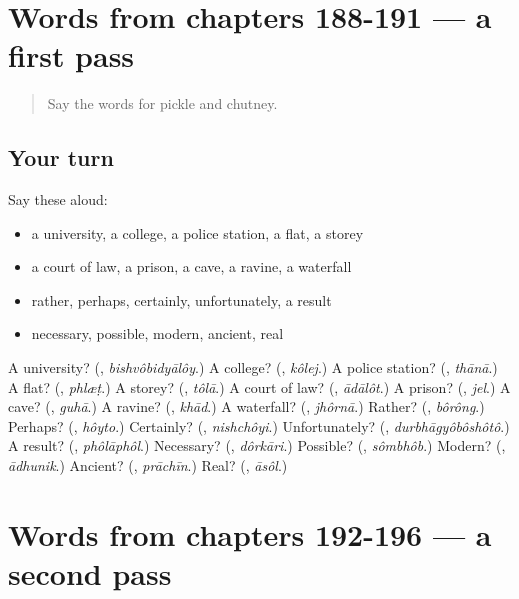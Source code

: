 \section[(dialogue)]{Words from chapters 188-191 — a first pass}

\label{lesson:BN-R196-first-pass-words-from-chapters-188-191}



\begin{quote}
Say the words for pickle and chutney.
\end{quote}

\subsection*{Your turn}
Say these aloud:

\begin{itemize}
\raggedright
  \item a university, a college, a police station, a flat, a storey
  \item a court of law, a prison, a cave, a ravine, a waterfall
  \item rather, perhaps, certainly, unfortunately, a result
  \item necessary, possible, modern, ancient, real
\end{itemize}

\begin{tcolorbox}[breakable,colback=teal!4,colframe=teal!35!black,title={Before you move on}]
A university? (\textbf{}, \emph{bishvôbidyālôy}.) A college? (\textbf{}, \emph{kôlej}.) A police station? (\textbf{}, \emph{thānā}.) A flat? (\textbf{}, \emph{phlæṭ}.) A storey? (\textbf{}, \emph{tôlā}.) A court of law? (\textbf{}, \emph{ādālôt}.) A prison? (\textbf{}, \emph{jel}.) A cave? (\textbf{}, \emph{guhā}.) A ravine? (\textbf{}, \emph{khād}.) A waterfall? (\textbf{}, \emph{jhôrnā}.) Rather? (\textbf{}, \emph{bôrông}.) Perhaps? (\textbf{}, \emph{hôyto}.) Certainly? (\textbf{}, \emph{nishchôyi}.) Unfortunately? (\textbf{}, \emph{durbhāgyôbôshôtô}.) A result? (\textbf{}, \emph{phôlāphôl}.) Necessary? (\textbf{}, \emph{dôrkāri}.) Possible? (\textbf{}, \emph{sômbhôb}.) Modern? (\textbf{}, \emph{ādhunik}.) Ancient? (\textbf{}, \emph{prāchīn}.) Real? (\textbf{}, \emph{āsôl}.)
\end{tcolorbox}
\section[(dialogue)]{Words from chapters 192-196 — a second pass}

